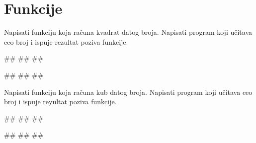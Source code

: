 \section{Funkcije}



\begin{Exercise}[label=v1.4_01] 
Napisati funkciju  koja računa kvadrat datog
broja. Napisati program koji učitava ceo broj i ispuje rezultat poziva
funkcije.

\begin{miditest}
\begin{upotreba}{1}
#\naslovInt#
##
##
\end{upotreba}
\end{miditest}
\begin{miditest}
\begin{upotreba}{2}
#\naslovInt#
##
##
\end{upotreba}
\end{miditest}

\end{Exercise}
\begin{Answer}[ref=v1.4_01]
\end{Answer}


\begin{Exercise}[label=v1.4_01b] 
Napisati funkciju  koja računa kub datog
broja. Napisati program koji učitava ceo broj i ispuje reyultat poziva
funkcije.

\begin{miditest}
\begin{upotreba}{1}
#\naslovInt#
##
##
\end{upotreba}
\end{miditest}
\begin{miditest}
\begin{upotreba}{2}
#\naslovInt#
##
##
\end{upotreba}
\end{miditest}

\end{Exercise}
\begin{Answer}[ref=v1.4_01b]
\end{Answer}

